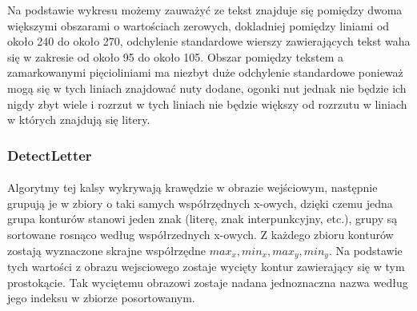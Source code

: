 \documentclass[a4paper,12pt]{article}
\begin{document}
		    Na podstawie wykresu możemy zauważyć ze tekst znajduje się pomiędzy dwoma większymi obszarami o wartościach zerowych, dokladniej pomiędzy liniami od około 240 do około 270, odchylenie standardowe wierszy zawierających tekst waha się w zakresie od około 95 do około 105. Obszar pomiędzy tekstem a zamarkowanymi pięcioliniami ma niezbyt duże odchylenie standardowe ponieważ mogą się w tych liniach znajdować nuty dodane, ogonki nut jednak nie będzie ich nigdy zbyt wiele i rozrzut w tych liniach nie będzie większy od rozrzutu w liniach w których znajdują się litery.

        \subsubsection{DetectLetter}
            \paragraph{} Algorytmy tej kalsy wykrywają krawędzie w obrazie wejściowym,     następnie grupują je w zbiory o taki samych współrzędnych x-owych, dzięki    czemu jedna grupa konturów stanowi jeden znak (literę, znak                 interpunkcyjny, etc.), grupy są sortowane rosnąco według współrzednych      x-owych. Z każdego zbioru konturów zostają wyznaczone skrajne współrzędne    $ max_{x} , min_{x}, max_{y}, min_{y} $. Na podstawie tych wartości z       obrazu wejsciowego zostaje wycięty kontur zawierający się w tym             prostokącie. Tak wyciętemu obrazowi zostaje nadana jednoznaczna nazwa       według jego indeksu w zbiorze posortowanym. 
    
\end{document}
